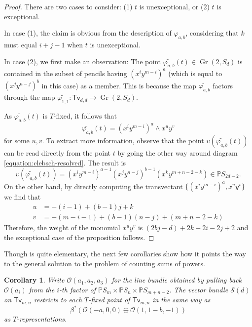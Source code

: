 \documentclass[reqno, 11pt]{amsart}
\theoremstyle{plain}
\newtheorem{corollary}[theorem]{Corollary}
\theoremstyle{remark}
\renewcommand{\P}{\mathbb{P}}
\renewcommand{\O}{\mathscr{O}}
\renewcommand{\S}{\mathscr{S}}
\DeclareMathOperator{\Gr}{Gr}
\newcommand{\transvectant}{\mathsf{Tv}}
\begin{document}
\begin{proof}
    There are two cases to consider: (1) $t$ is unexceptional, or (2) $t$ is exceptional. 
    
    
    In case (1), the claim is obvious from the description of $\varphi_{a,b}$, considering that $k$ must equal $i+j-1$ when $t$ is unexceptional.  
    
    In case (2), we first make an observation: The point $\widetilde{\varphi_{a,b}}(t) \in \Gr(2,S_{d})$ is contained in the subset of pencils having $(x^{i}y^{m-i})^{a}$ (which is equal to $(x^{j}y^{n-j})^{b}$ in this case) as a member. This is because the map $\widetilde{\varphi_{a,b}}$ factors through the map $\widetilde{\varphi_{1,1}}: \transvectant_{d,d} \to \Gr(2,S_{d})$.
    
    As $\widetilde{\varphi_{a,b}}(t)$ is $T$-fixed, it follows that \[\widetilde{\varphi_{a,b}}(t) = (x^{i}y^{m-i})^{a} \wedge x^{u}y^{v}\] for some $u,v$. To extract more information, observe that the point $\upsilon(\widetilde{\varphi_{a,b}}(t))$ can be read directly from the point $t$ by going the other way around diagram \eqref{equation:clebsch-resolved}. The result is \[\upsilon(\widetilde{\varphi_{a,b}}(t)) = (x^{i}y^{m-i})^{a-1}(x^{j}y^{n-j})^{b-1}(x^{k}y^{m+n-2-k}) \in \P S_{2d-2}.\]  On the other hand, by directly computing the transvectant $\{(x^{i}y^{m-i})^{a} , x^{u}y^{v} \}$ we find that 
    \begin{align*}
        u &= -(i-1) + (b-1)j + k\\
        v &= -(m-i-1) + (b-1)(n-j) + (m+n-2-k)
    \end{align*}
    Therefore, the weight of the monomial $x^{u}y^{v}$ is $(2bj-d)+2k-2i -2j+2$ and the exceptional case of the proposition follows.
\end{proof}

Though  is quite elementary, the next few corollaries show how it points the way to the general solution to the problem of counting sums of powers.  

\begin{corollary}
\label{corollary:samerestriction}
Write $\O(a_1,a_2,a_3)$ for the line bundle obtained by pulling back $\O(a_{i})$ from the $i$-th factor of $\P S_{m} \times \P S_{n} \times \P S_{m+n-2}$. The vector bundle $\S(d)$ on $\transvectant_{m,n}$ restricts to each $T$-fixed point of $\transvectant_{m,n}$ in the same way as \[\beta^{*}\left(\O(-a,0,0) \oplus \O(1,1-b,-1)\right)\] as $T$-representations. 
\end{corollary}
\end{document}
